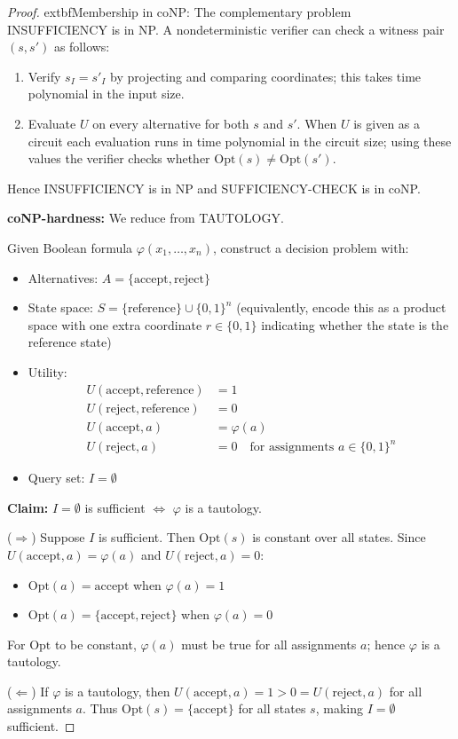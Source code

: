 \begin{proof}
	extbf{Membership in coNP:} The complementary problem INSUFFICIENCY is in NP. A nondeterministic verifier can check a witness pair $(s,s')$ as follows:
\begin{enumerate}
  \item Verify $s_I = s'_I$ by projecting and comparing coordinates; this takes time polynomial in the input size.
  \item Evaluate $U$ on every alternative for both $s$ and $s'$. When $U$ is given as a circuit each evaluation runs in time polynomial in the circuit size; using these values the verifier checks whether $\text{Opt}(s) \neq \text{Opt}(s')$.
\end{enumerate}
Hence INSUFFICIENCY is in NP and SUFFICIENCY-CHECK is in coNP.

\textbf{coNP-hardness:} We reduce from TAUTOLOGY.

Given Boolean formula $\varphi(x_1, \ldots, x_n)$, construct a decision problem with:
\begin{itemize}
    \item Alternatives: $A = \{\text{accept}, \text{reject}\}$
    \item State space: $S = \{\text{reference}\} \cup \{0,1\}^n$ (equivalently, encode this as a product space with one extra coordinate $r \in \{0,1\}$ indicating whether the state is the reference state)
    \item Utility:
    \begin{align*}
        U(\text{accept}, \text{reference}) &= 1 \\
        U(\text{reject}, \text{reference}) &= 0 \\
        U(\text{accept}, a) &= \varphi(a) \\
        U(\text{reject}, a) &= 0 \quad \text{for assignments } a \in \{0,1\}^n
    \end{align*}
    \item Query set: $I = \emptyset$
\end{itemize}

\textbf{Claim:} $I = \emptyset$ is sufficient $\iff$ $\varphi$ is a tautology.

($\Rightarrow$) Suppose $I$ is sufficient. Then $\text{Opt}(s)$ is constant over all states. Since $U(\text{accept}, a) = \varphi(a)$ and $U(\text{reject}, a) = 0$:
\begin{itemize}
    \item $\text{Opt}(a) = \text{accept}$ when $\varphi(a) = 1$
    \item $\text{Opt}(a) = \{\text{accept}, \text{reject}\}$ when $\varphi(a) = 0$
\end{itemize}
For $\text{Opt}$ to be constant, $\varphi(a)$ must be true for all assignments $a$; hence $\varphi$ is a tautology.

($\Leftarrow$) If $\varphi$ is a tautology, then $U(\text{accept}, a) = 1 > 0 = U(\text{reject}, a)$ for all assignments $a$. Thus $\text{Opt}(s) = \{\text{accept}\}$ for all states $s$, making $I = \emptyset$ sufficient.
\end{proof}

